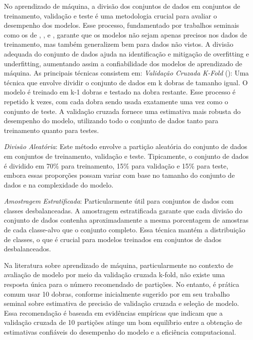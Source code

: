 No aprendizado de máquina, a divisão dos conjuntos de dados em conjuntos de treinamento, validação e teste é uma metodologia crucial para avaliar o desempenho dos modelos. Esse processo, fundamentado por trabalhos seminais como os de \cite{kohavi1995study}, \cite{Breiman1984}, e \cite{hastie2009elements}, garante que os modelos não sejam apenas precisos nos dados de treinamento, mas também generalizem bem para dados não vistos. A divisão adequada do conjunto de dados ajuda na identificação e mitigação de overfitting e underfitting, aumentando assim a confiabilidade dos modelos de aprendizado de máquina.
As principais técnicas consistem em:
\textit{Validação Cruzada K-Fold} (\cite{kohavi1995study}): Uma técnica que envolve dividir o conjunto de dados em k dobras de tamanho igual. O modelo é treinado em k-1 dobras e testado na dobra restante. Esse processo é repetido k vezes, com cada dobra sendo usada exatamente uma vez como o conjunto de teste. A validação cruzada fornece uma estimativa mais robusta do desempenho do modelo, utilizando todo o conjunto de dados tanto para treinamento quanto para testes.

\textit{Divisão Aleatória}: Este método envolve a partição aleatória do conjunto de dados em conjuntos de treinamento, validação e teste. Tipicamente, o conjunto de dados é dividido em 70\% para treinamento, 15\% para validação e 15\% para teste, embora essas proporções possam variar com base no tamanho do conjunto de dados e na complexidade do modelo.

\textit{Amostragem Estratificada}: Particularmente útil para conjuntos de dados com classes desbalanceadas. A amostragem estratificada garante que cada divisão do conjunto de dados contenha aproximadamente a mesma porcentagem de amostras de cada classe-alvo que o conjunto completo. Essa técnica mantém a distribuição de classes, o que é crucial para modelos treinados em conjuntos de dados desbalanceados.

Na literatura sobre aprendizado de máquina, particularmente no contexto de avaliação de modelo por meio da validação cruzada k-fold, não existe uma resposta única para o número recomendado de partições. No entanto, é prática comum usar 10 dobras, conforme inicialmente sugerido por \cite{kohavi1995study} em seu trabalho seminal sobre estimativa de precisão de validação cruzada e seleção de modelo. Essa recomendação é baseada em evidências empíricas que indicam que a validação cruzada de 10 partições atinge um bom equilíbrio entre a obtenção de estimativas confiáveis do desempenho do modelo e a eficiência computacional.

